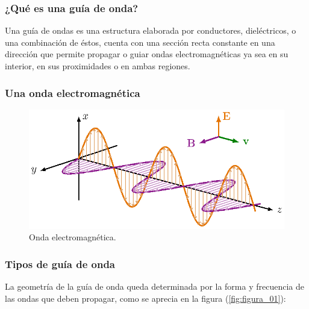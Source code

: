 \documentclass[12pt]{beamer}
\begin{document}
\begin{frame}
\frametitle{¿Qué es una guía de onda?}
Una guía de ondas es una estructura elaborada por conductores, dieléctricos, o una combinación de éstos, cuenta con una sección recta constante en una dirección que permite propagar o guiar ondas electromagnéticas ya sea en su interior, en sus proximidades o en ambas regiones.
\end{frame}
\begin{frame}
\frametitle{Una onda electromagnética}
\begin{figure}[H]
    \centering
    \includegraphics[scale=1]{Imagenes/Onda_Electromagnetica.eps}
    \caption{Onda electromagnética.}
\end{figure}
\end{frame}
\begin{frame}
\frametitle{Tipos de guía de onda}
La geometría de la guía de onda queda determinada por la forma y frecuencia de las ondas que deben propagar, como se aprecia en la figura (\ref{fig:figura_01}):
\end{frame}
\end{document}
